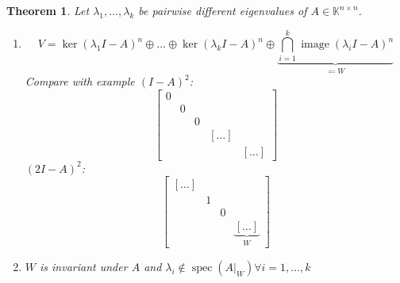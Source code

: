 \documentclass{article}
\newtheorem{theorem}{Theorem}  \numberwithin{theorem}{section}
\DeclareMathOperator{\im}{image}
\begin{document}
\begin{theorem} %
  Let $\lambda_1, \dots, \lambda_k$ be pairwise different eigenvalues of $A \in \mathbb K^{n\times n}$.
  \begin{enumerate}
    \item \[
        V = \ker(\lambda_1 I - A)^{n} \oplus \dots \oplus \ker(\lambda_k I - A)^n \oplus \underbrace{\bigcap_{i=1}^k \im(\lambda_i I - A)^n}_{\eqqcolon W}
      \]
      Compare with example $(I - A)^2$:
      \[
        \begin{bmatrix}
          0 &   &   &         & \\
            & 0 &   &         & \\
            &   & 0 &         & \\
            &   &   & [\dots] & \\
            &   &   &         & [\dots]
        \end{bmatrix}
      \]
      $(2I - A)^2$:
      \[
        \begin{bmatrix}
          [\dots] &   &         & \\
            & 1 &         & \\
            &   & 0 & \\
            &   &         & \underbrace{[\dots]}_{W}
        \end{bmatrix}
      \]
    \item $W$ is invariant under $A$ and $\lambda_i \not\in \operatorname{spec}(A|_W) \forall i = 1, \dots, k$
  \end{enumerate}
\end{theorem}
\end{document}
